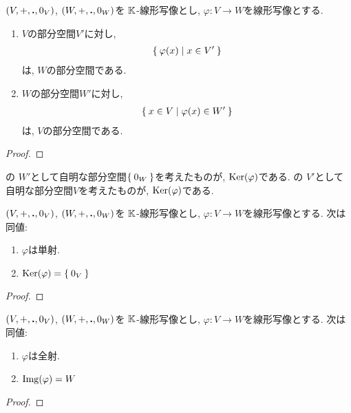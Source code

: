 \begin{prop}
  \label{subspace:prop:img:inverseimage}
  $(V,+,\mathbin{\boldsymbol{.}},0_V)$,
  $(W,+,\mathbin{\boldsymbol{.}},0_W)$を
  $\mathbb{K}$-線形写像とし,
  $\varphi\colon V\to W$を線形写像とする.
  \begin{enumerate}
  \item
    $V$の部分空間$V'$に対し,
    \begin{align*}
      \Set{\varphi(x)|x\in V'}
    \end{align*}
    は, $W$の部分空間である.
  \item
    $W$の部分空間$W'$に対し,
    \begin{align*}
      \Set{x\in V|\varphi(x)\in W'}
    \end{align*}
    は, $V$の部分空間である.
  \end{enumerate}
\end{prop}
\begin{proof}\end{proof}
\begin{remark}
  の
  $W'$として自明な部分空間$\Set{0_W}$を考えたものが,
  $\operatorname{Ker}(\varphi)$である.
  の
  $V'$として自明な部分空間$V$を考えたものが,
  $\operatorname{Ker}(\varphi)$である.
\end{remark}

\begin{prop}
  $(V,+,\mathbin{\boldsymbol{.}},0_V)$,
  $(W,+,\mathbin{\boldsymbol{.}},0_W)$を
  $\mathbb{K}$-線形写像とし,
  $\varphi\colon V\to W$を線形写像とする.
  次は同値:
  \begin{enumerate}
  \item $\varphi$は単射.
  \item $\operatorname{Ker}(\varphi)=\Set{0_V}$
  \end{enumerate}
\end{prop}
\begin{proof}\end{proof}

\begin{prop}
  $(V,+,\mathbin{\boldsymbol{.}},0_V)$,
  $(W,+,\mathbin{\boldsymbol{.}},0_W)$を
  $\mathbb{K}$-線形写像とし,
  $\varphi\colon V\to W$を線形写像とする.
  次は同値:
  \begin{enumerate}
  \item $\varphi$は全射.
  \item $\operatorname{Img}(\varphi)=W$
  \end{enumerate}
\end{prop}
\begin{proof}\end{proof}

